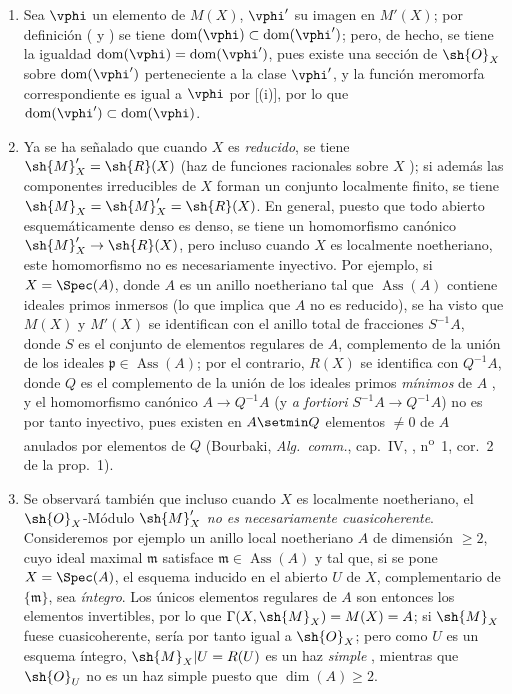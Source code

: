 \begin{remarks}[20.2.13]
\label{IV.20.2.13}
\begin{enumerate}[label=(\roman*)]
  \item Sea $\vphi$ un elemento de $M(X)$, $\vphi'$ su imagen en $M'(X)$; por definición ( y ) se tiene $\operatorname{dom}(\vphi)\subset\operatorname{dom}(\vphi')$; pero, de hecho, se tiene la igualdad $\operatorname{dom}(\vphi)=\operatorname{dom}(\vphi')$, pues existe una sección de $\sh{O}_X$ sobre $\operatorname{dom}(\vphi')$ perteneciente a la clase $\vphi'$, y la función meromorfa correspondiente es igual a $\vphi$ por [(i)], por lo que $\operatorname{dom}(\vphi')\subset\operatorname{dom}(\vphi)$.

  \item Ya se ha señalado que cuando $X$ es \emph{reducido}, se tiene $\sh{M}'_X=\sh{R}(X)$ (haz de funciones racionales sobre $X$ ); si además las componentes irreducibles de $X$ forman un conjunto localmente finito, se tiene $\sh{M}_X=\sh{M}'_X=\sh{R}(X)$.
  En general, puesto que todo abierto esquemáticamente denso es denso, se tiene un homomorfismo canónico $\sh{M}'_X\to\sh{R}(X)$, pero incluso cuando $X$ es localmente noetheriano, este homomorfismo no es necesariamente inyectivo.
  Por ejemplo, si $X=\Spec(A)$, donde $A$ es un anillo noetheriano tal que $\operatorname{Ass}(A)$ contiene ideales primos inmersos (lo que implica que $A$ no es reducido), se ha visto que $M(X)$ y $M'(X)$ se identifican con el anillo total de fracciones $S^{-1}A$,
  donde $S$ es el conjunto de elementos regulares de $A$, complemento de la unión de los ideales $\mathfrak{p}\in\operatorname{Ass}(A)$; por el contrario, $R(X)$ se identifica con $Q^{-1}A$, donde $Q$ es el complemento de la unión de los ideales primos \emph{mínimos} de $A$ , y el homomorfismo canónico $A\to Q^{-1}A$ (y \emph{a fortiori} $S^{-1}A\to Q^{-1}A$) no es por tanto inyectivo, pues existen en $A\setmin Q$ elementos $\neq0$ de $A$ anulados por elementos de $Q$ (Bourbaki, \emph{Alg.~comm.}, cap.~IV, , n\textsuperscript{o}~1, cor.~2 de la prop.~1).

  \item Se observará también que incluso cuando $X$ es localmente noetheriano, el $\sh{O}_X$-Módulo $\sh{M}'_X$ \emph{no es necesariamente cuasicoherente}.
  Consideremos por ejemplo un anillo local noetheriano $A$ de dimensión $\geq2$, cuyo ideal maximal $\mathfrak{m}$ satisface $\mathfrak{m}\in\operatorname{Ass}(A)$ y tal que, si se pone $X=\Spec(A)$, el esquema inducido en el abierto $U$ de $X$, complementario de $\{\mathfrak{m}\}$, sea \emph{íntegro}.
  Los únicos elementos regulares de $A$ son entonces los elementos invertibles, por lo que $\Gamma(X,\sh{M}_X)=M(X)=A$; si $\sh{M}_X$ fuese cuasicoherente, sería por tanto igual a $\sh{O}_X$; pero como $U$ es un esquema íntegro, $\sh{M}_X|U=R(U)$ es un haz \emph{simple} , mientras que $\sh{O}_U$ no es un haz simple puesto que $\dim(A)\geq2$.


\end{enumerate}
\end{remarks}
